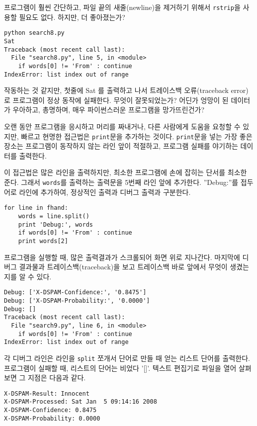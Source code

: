 \begin{enumerate}
프로그램이 훨씬 간단하고, 파일 끝의 새줄(newline)을 제거하기 위해서 {\tt rstrip}을 사용할 필요도 없다.
하지만, 더 좋아졌는가?

\beforeverb
\begin{verbatim}
python search8.py 
Sat
Traceback (most recent call last):
  File "search8.py", line 5, in <module>
    if words[0] != 'From' : continue
IndexError: list index out of range
\end{verbatim}
\afterverb
%

작동하는 것 같지만, 첫줄에 Sat 를 출력하고 나서 트레이스백 오류(traceback error)로 프로그램이 정상 동작에 실패한다.
무엇이 잘못되었는가? 어딘가 엉망이 된 데이터가 우아하고, 총명하며, 매우 파이썬스러운 프로그램을 망가뜨린건가?

오랜 동안 프로그램을 응시하고 머리를 짜내거나, 다른 사람에게 도움을 요청할 수 있지만, 빠르고 현명한 접근법은 {\tt print}문을 추가하는 것이다.
{\tt print}문을 넣는 가장 좋은 장소는 프로그램이 동작하지 않는 라인 앞이 적절하고, 프로그램 실패를 야기하는 데이터를 출력한다.

이 접근법은 많은 라인을 출력하지만, 최소한 프로그램에 손에 잡히는 단서를 최소한 준다. 
그래서 {\tt words}를 출력하는 출력문을 5번째 라인 앞에 추가한다. ''Debug:''를 접두어로 라인에 추가하여, 
정상적인 출력과 디버그 출력과 구분한다.

\beforeverb
\begin{verbatim}
for line in fhand:
    words = line.split()
    print 'Debug:', words
    if words[0] != 'From' : continue
    print words[2]
\end{verbatim}
\afterverb
%

프로그램을 실행할 때, 많은 출력결과가 스크롤되어 화면 위로 지나간다. 
마지막에 디버그 결과물과 트레이스백(traceback)을 보고 트레이스백 바로 앞에서 무엇이 생겼는지를 알 수 있다.

\beforeverb
\begin{verbatim}
Debug: ['X-DSPAM-Confidence:', '0.8475']
Debug: ['X-DSPAM-Probability:', '0.0000']
Debug: []
Traceback (most recent call last):
  File "search9.py", line 6, in <module>
    if words[0] != 'From' : continue
IndexError: list index out of range
\end{verbatim}
\afterverb
%

각 디버그 라인은 라인을 {\tt split} 쪼개서 단어로 만들 때 얻는 리스트 단어를 출력한다.
프로그램이 실패할 때, 리스트의 단어는 비었다 '[]'. 텍스트 편집기로 파일을 열어 살펴보면 그 지점은 다음과 같다.

\beforeverb
\begin{verbatim}
X-DSPAM-Result: Innocent
X-DSPAM-Processed: Sat Jan  5 09:14:16 2008
X-DSPAM-Confidence: 0.8475
X-DSPAM-Probability: 0.0000


\end{verbatim}
\end{enumerate}
